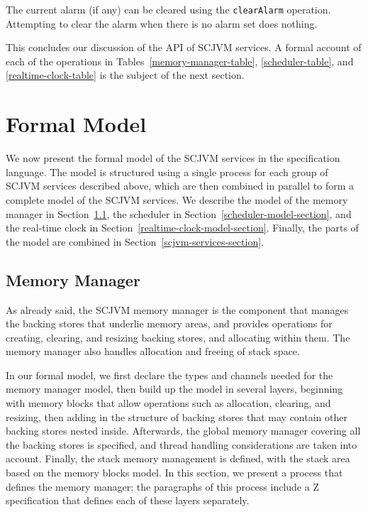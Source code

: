 The current alarm (if any) can be cleared using the
\texttt{clear\-Alarm} operation.
Attempting to clear the alarm when there is no alarm set does nothing.

This concludes our discussion of the API of SCJVM services.
A formal account of each of the operations in
Tables~\ref{memory-manager-table}, \ref{scheduler-table}, and
\ref{realtime-clock-table} is the subject of the next section. 

\section{Formal Model}
\label{formal-model-section}

We now present the formal model of the SCJVM services in the \Circus{}
specification language.
The model is structured using a single process for each group of SCJVM
services described above, which are then combined in parallel to form
a complete model of the SCJVM services.
We describe the model of the memory manager in
Section~\ref{memory-manager-model-section}, the scheduler in
Section~\ref{scheduler-model-section}, and the real-time clock in
Section~\ref{realtime-clock-model-section}.
Finally, the parts of the model are combined in
Section~\ref{scjvm-services-section}.


\subsection{Memory Manager}
\label{memory-manager-model-section}

As already said, the SCJVM memory manager is the component that
manages the backing stores that underlie memory areas, and provides
operations for creating, clearing, and resizing backing stores, and
allocating within them.
The memory manager also handles allocation and freeing of stack space.

In our formal model, we first declare the types and channels needed
for the memory manager model, then build up the model in several
layers, beginning with memory blocks that allow operations such as
allocation, clearing, and resizing, then adding in the structure of
backing stores that may contain other backing stores nested inside.
Afterwards, the global memory manager covering all the backing stores
is specified, and thread handling considerations are taken into
account.
Finally, the stack memory management is defined, with the stack area
based on the memory blocks model.
In this section, we present a \Circus{} process that defines the
memory manager; the paragraphs of this process include a Z
specification that defines each of these layers separately.

